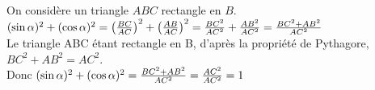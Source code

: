 
On considère un triangle $ABC$ rectangle en $B$.
$(\sin \alpha)^2+(\cos \alpha)^2 = 
\left({BC\over AC}\right)^2+\left({ AB\over  AC}\right)^2 =
{ BC^2\over  AC^2}+{ AB^2\over  AC^2} = 
{ BC^2+ AB^2\over  AC^2}$\\
Le triangle ABC étant rectangle en B, d'après la propriété de Pythagore,
$ BC^2+ AB^2 = AC^2$.\\
Donc $(\sin \alpha)^2+(\cos \alpha)^2 =
{ BC^2+ AB^2\over  AC^2} = { AC^2\over  AC^2} = 1$